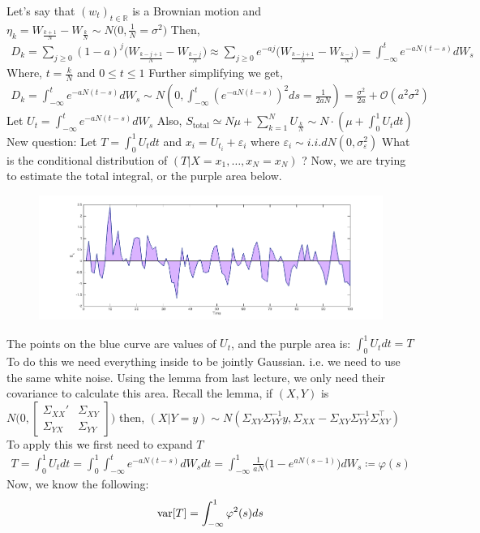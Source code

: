 \documentclass[../../../Master/AppliedStochastics.tex]{subfiles}
\begin{document}
Let's say that $(w_{t})_{t\in\mathbb{R}}$ is a Brownian motion 
and $\eta_{k}= W_\frac{{k+1}}{N} - W_\frac{{k}}{N} \sim N\big(0, \frac{1}{N}=\sigma^2\big)$
Then, 
$$\begin{aligned}
D_{k}= \sum_{j\geq0} (1-a)^j \Big(W_\frac{{k-j+1}}{N} - W_\frac{{k-j}}{N} \Big) \approx \sum_{j\geq0} e^{-aj} \Big(W_\frac{{k-j+1}}{N} - W_\frac{{k-j}}{N} \Big) = \int_{-\infty}^{t} e^{-aN(t-s)}dW_{s}
\end{aligned}$$
Where, $t=\frac{k}{N}$ and $0\leq t \leq 1$ 
Further simplifying we get, 
$$\begin{aligned}
D_{k}= \int_{-\infty}^{t} e^{-aN(t-s)}dW_{s} \sim N(0, \int_{-\infty}^{t}(e^{-aN(t-s)})^2 ds = \frac{1}{2aN}) = \frac{\sigma^2}{2a} + \mathcal{O}(a^2\sigma^2)
\end{aligned}$$
Let $U_{t} = \int_{-\infty}^{t} e^{-aN(t-s)} dW_{s}$ 
Also, $S_{\mathrm{total}}\simeq N\mu + \sum_{k=1}^{N} U_{\frac{k}{N}} \sim N\cdot(\mu + \int_{0}^{1}U_{t}dt)$
New question: Let $T=\int_{0}^{1} U_{t}dt$ 
and $x_{i} = U_{t_{i}} + \varepsilon_{i}$ where $\varepsilon_{i}\sim i.i.d N(0,\sigma_{\varepsilon}^2)$ 
What is the conditional distribution of $(T\vert X=x_{1},\dotso, x_{N}=x_{N})$ ? 
Now, we are trying to estimate the total integral, or the purple area below. 
\begin{figure}[H]
	\centering
	\includegraphics[width=0.7\linewidth]{area2}
	\caption*{}
	\label{fig:area2}
\end{figure}
The points on the blue curve are values of $U_{t}$, 
and the purple area is: $\int_{0}^{1} U_{t}dt = T$ 
To do this we need everything inside to be jointly Gaussian. 
i.e. we need to use the same white noise. 
Using the lemma from last lecture, 
we only need their covariance to calculate this area.
Recall the lemma,
if $(X,Y)$ is $N\Bigg(0, \begin{bmatrix} \Sigma_{XX}' & \Sigma_{XY} \\ \Sigma_{YX} & \Sigma_{YY}\end{bmatrix}\Bigg)$
then, $(X\vert Y=y) \sim N(\Sigma_{XY}\Sigma_{YY}^{-1}y, \Sigma_{XX}-\Sigma_{XY}\Sigma_{YY}^{-1}\Sigma_{XY}^{\intercal})$
To apply this we first need to expand $T$ 
$$\begin{aligned}
T = \int_{0}^{1} U_{t}dt = \int_{0}^{1}\int_{-\infty}^{t} e^{-aN(t-s)} dW_{s}dt= \int_{-\infty}^{1} \frac{1}{aN}\big(1-e^{aN(s-1)}\big)dW_{s}\coloneqq \varphi(s)
\end{aligned}$$ 
Now, we know the following: 
$$\begin{aligned}
\var[T] = \int_{-\infty}^{1} \varphi^{2}(s) ds 
\end{aligned}$$ 
\end{document}
